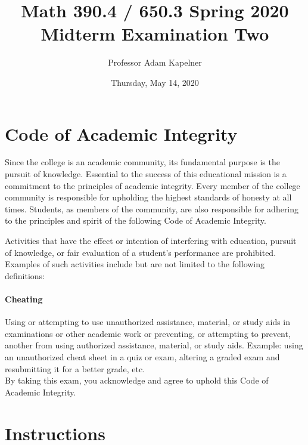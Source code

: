 \documentclass[12pt]{article}
\title{Math 390.4 / 650.3 Spring 2020 \\ Midterm Examination Two}
\author{Professor Adam Kapelner}
\date{Thursday, May 14, 2020}
\begin{document}
\maketitle


\thispagestyle{empty}

\section*{Code of Academic Integrity}

\footnotesize
Since the college is an academic community, its fundamental purpose is the pursuit of knowledge. Essential to the success of this educational mission is a commitment to the principles of academic integrity. Every member of the college community is responsible for upholding the highest standards of honesty at all times. Students, as members of the community, are also responsible for adhering to the principles and spirit of the following Code of Academic Integrity.

Activities that have the effect or intention of interfering with education, pursuit of knowledge, or fair evaluation of a student's performance are prohibited. Examples of such activities include but are not limited to the following definitions:

\paragraph{Cheating} Using or attempting to use unauthorized assistance, material, or study aids in examinations or other academic work or preventing, or attempting to prevent, another from using authorized assistance, material, or study aids. Example: using an unauthorized cheat sheet in a quiz or exam, altering a graded exam and resubmitting it for a better grade, etc.
\\

\noindent By taking this exam, you acknowledge and agree to uphold this Code of Academic Integrity. \\


\normalsize

\section*{Instructions}
\end{document}
